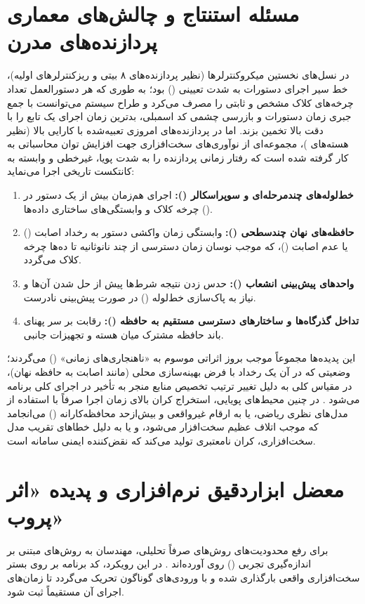 \section{مسئله استنتاج  و چالش‌های معماری پردازنده‌های مدرن}
در نسل‌های نخستین میکروکنترلرها (نظیر پردازنده‌های ۸ بیتی و ریزکنترلرهای اولیه)، خط سیر اجرای دستورات به شدت تعیینی () بود؛ به طوری که هر دستورالعمل تعداد چرخه‌های کلاک مشخص و ثابتی را مصرف می‌کرد و طراح سیستم می‌توانست با جمع جبری زمان دستورات و بازرسی چشمی کد اسمبلی، بدترین زمان اجرای یک تابع را با دقت بالا تخمین بزند. اما در پردازنده‌های امروزی تعبیه‌شده با کارایی بالا (نظیر هسته‌های )، مجموعه‌ای از نوآوری‌های سخت‌افزاری جهت افزایش توان محاسباتی به کار گرفته شده است که رفتار زمانی پردازنده را به شدت پویا، غیرخطی و وابسته به کانتکست تاریخی اجرا می‌نماید:
\begin{enumerate}
    \item \textbf{خط‌لوله‌های چندمرحله‌ای و سوپراسکالر ():} اجرای هم‌زمان بیش از یک دستور در چرخه کلاک و وابستگی‌های ساختاری داده‌ها ().
    \item \textbf{حافظه‌های نهان چندسطحی ():} وابستگی زمان واکشی دستور به رخداد اصابت () یا عدم اصابت ()، که موجب نوسان زمان دسترسی از چند نانوثانیه تا ده‌ها چرخه کلاک می‌گردد.
    \item \textbf{واحدهای پیش‌بینی انشعاب ():} حدس زدن نتیجه شرط‌ها پیش از حل شدن آن‌ها و نیاز به پاک‌سازی خط‌لوله () در صورت پیش‌بینی نادرست.
    \item \textbf{تداخل گذرگاه‌ها و ساختارهای دسترسی مستقیم به حافظه ():} رقابت بر سر پهنای باند حافظه مشترک میان هسته و تجهیزات جانبی.
\end{enumerate}

این پدیده‌ها مجموعاً موجب بروز اثراتی موسوم به «ناهنجاری‌های زمانی» () می‌گردند؛ وضعیتی که در آن یک رخداد با فرض بهینه‌سازی محلی (مانند اصابت به حافظه نهان)، در مقیاس کلی به دلیل تغییر ترتیب تخصیص منابع منجر به تأخیر در اجرای کلی برنامه می‌شود \cite{cullmann2010predictability}. در چنین محیط‌های پویایی، استخراج کران بالای زمان اجرا صرفاً با استفاده از مدل‌های نظری ریاضی، یا به ارقام غیرواقعی و بیش‌ازحد محافظه‌کارانه () می‌انجامد که موجب اتلاف عظیم سخت‌افزار می‌شود، و یا به دلیل خطاهای تقریب مدل سخت‌افزاری، کران نامعتبری تولید می‌کند که نقض‌کننده ایمنی سامانه است.

\section{معضل ابزاردقیق نرم‌افزاری و پدیده «اثر پروب»}
برای رفع محدودیت‌های روش‌های صرفاً تحلیلی، مهندسان به روش‌های مبتنی بر اندازه‌گیری تجربی () روی آورده‌اند \cite{bernat2002wcet}. در این رویکرد، کد برنامه بر روی بستر سخت‌افزاری واقعی بارگذاری شده و با ورودی‌های گوناگون تحریک می‌گردد تا زمان‌های اجرای آن مستقیماً ثبت شود.

